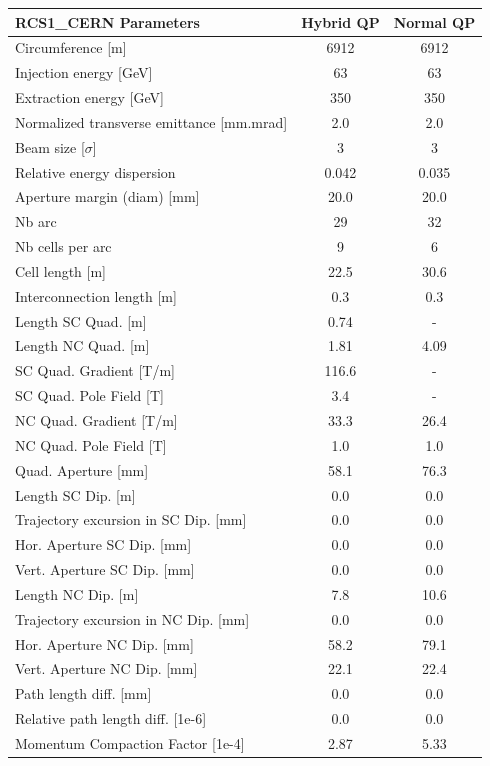 \begin{tabular}{lcc}
\toprule
RCS1_CERN Parameters & Hybrid QP & Normal QP \\
\midrule
Circumference [m] & 6912 & 6912 \\
Injection energy [GeV] & 63 & 63 \\
Extraction energy [GeV] & 350 & 350 \\
Normalized transverse emittance [mm.mrad] & 2.0 & 2.0 \\
Beam size [$\sigma$] & 3 & 3 \\
Relative energy dispersion & 0.042 & 0.035 \\
Aperture margin (diam) [mm] & 20.0 & 20.0 \\
Nb arc & 29 & 32 \\
Nb cells per arc & 9 & 6 \\
Cell length [m] & 22.5 & 30.6 \\
Interconnection length [m] & 0.3 & 0.3 \\
Length SC Quad. [m] & 0.74 & - \\
Length NC Quad. [m] & 1.81 & 4.09 \\
SC Quad. Gradient [T/m] & 116.6 & - \\
SC Quad. Pole Field [T] & 3.4 & - \\
NC Quad. Gradient [T/m] & 33.3 & 26.4 \\
NC Quad. Pole Field [T] & 1.0 & 1.0 \\
Quad. Aperture [mm] & 58.1 & 76.3 \\
Length SC Dip. [m] & 0.0 & 0.0 \\
Trajectory excursion in SC Dip. [mm] & 0.0 & 0.0 \\
Hor. Aperture SC Dip. [mm] & 0.0 & 0.0 \\
Vert. Aperture SC Dip. [mm] & 0.0 & 0.0 \\
Length NC Dip. [m] & 7.8 & 10.6 \\
Trajectory excursion in NC Dip. [mm] & 0.0 & 0.0 \\
Hor. Aperture NC Dip. [mm] & 58.2 & 79.1 \\
Vert. Aperture NC Dip. [mm] & 22.1 & 22.4 \\
Path length diff. [mm] & 0.0 & 0.0 \\
Relative path length diff. [1e-6] & 0.0 & 0.0 \\
Momentum Compaction Factor [1e-4] & 2.87 & 5.33 \\
\bottomrule
\end{tabular}
